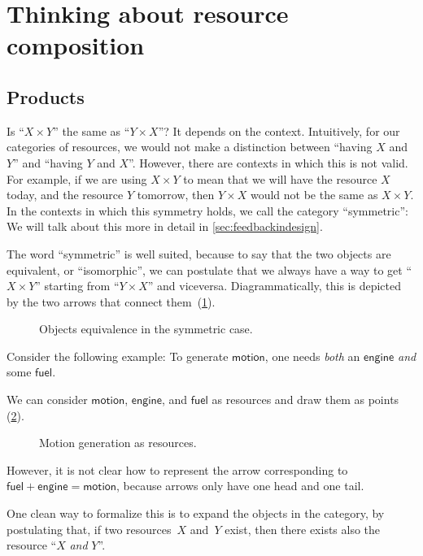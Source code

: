 \section{Thinking about resource composition}
\label{sec:productset}
\subsection{Products}
Is ``$X \times Y$'' the same as ``$Y \times X$''?
It depends on the context. Intuitively, for our categories of resources, we would not make a distinction
between ``having $X$ and $Y$'' and ``having $Y$ and $X$''.
However, there are contexts in which this is not valid. For example, if we are
using $X \times Y$ to mean that we will have the resource $X$ today, and the
resource $Y$ tomorrow, then $Y \times X$ would not be the same as $X \times Y$. In the contexts in which this symmetry holds, we call the category ``symmetric'': We will talk about this more in detail in \cref{sec:feedbackindesign}.

The word ``symmetric'' is well suited, because to say that the two objects are equivalent, or ``isomorphic'', we can postulate that we always have a way to get
``$X \times Y$'' starting from ``$Y \times X$'' and viceversa. Diagrammatically, this is depicted
by the two arrows that connect them~(\cref{fig:e17}).

\begin{figure}[h!]
    \centering
    \caption{Objects equivalence in the symmetric case. \label{fig:e17}}
\end{figure}

\noindent Consider the following example: To generate $\mathsf{motion}$, one needs \emph{both} an $\mathsf{engine}$ \emph{and} some $\mathsf{fuel}$.

We can consider $\mathsf{motion}$, $\mathsf{engine}$, and $\mathsf{fuel}$ as resources and draw them as points (\cref{fig:e11}).

\begin{figure}[h!]
    \centering
    \caption{Motion generation as resources. \label{fig:e11}}
\end{figure}

However, it is not clear how to represent the arrow corresponding to
$\mathsf{fuel} + \mathsf{engine} = \mathsf{motion}$, because arrows only have one head and one tail.

One clean way to formalize this is to expand the objects in the category, by postulating that, if two resources~$X$ and~$Y$ exist, then there exists also the resource ``$X$ \emph{and} $Y$''.

